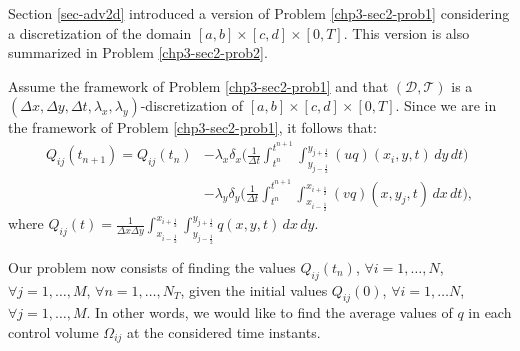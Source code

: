 Section \ref{sec-adv2d} introduced a version of Problem \ref{chp3-sec2-prob1}
considering a discretization of the domain $[a,b] \times [c,d] \times[0,T]$. 
This version is also summarized in Problem \ref{chp3-sec2-prob2}.	
\begin{prob}
	\label{chp3-sec2-prob2}
	Assume the framework of Problem \ref{chp3-sec2-prob1}
	and that $(\mathcal{D},\mathcal{T})$ is a $(\Delta x, \Delta y, \Delta t, \lambda_x,\lambda_y)$-discretization of $[a,b]\times [c,d]\times [0,T]$.
	Since we are in the framework of Problem \ref{chp3-sec2-prob1}, it follows that:
	\begin{align*}
		{Q}_{ij}(t_{n+1})  = {Q}_{ij}(t_{n})
		&- {\lambda_x}
		\delta _x \bigg( \frac{1}{\Delta t}
		\int_{t^n}^{t^{n+1}} \int_{y_{j-\frac{1}{2}}}^{y_{j+\frac{1}{2}}} 
		{(uq)}(x_{i}, y, t)
		\,dy \,dt \bigg) \\ \nonumber
		&- {\lambda_y}
		\delta _y \bigg( \frac{1}{\Delta t}
		\int_{t^n}^{t^{n+1}} \int_{x_{i-\frac{1}{2}}}^{x_{i+\frac{1}{2}}} 
		{(vq)}(x, y_{j}, t)
		\,dx \,dt \bigg),
	\end{align*}
	where ${Q}_{ij}(t) = \frac{1}{\Delta x \Delta y}
	\int_{x_{i-\frac{1}{2}}}^{x_{i+\frac{1}{2}}} 
	\int_{y_{j-\frac{1}{2}}}^{y_{j+\frac{1}{2}}} {q}(x,y,t) \,dx \,dy$.
	
	Our problem now consists of finding the values ${Q}_{ij}(t_{n})$, 
	$\forall i = 1, \ldots, N$, $\forall j = 1, \ldots, M$, $\forall n = 1, \ldots, N_T$,
    given the initial values ${Q}_{ij}(0)$, $\forall i = 1, \ldots N$, $\forall j = 1, \ldots, M$.
	In other words, we would like to find the average values of ${q}$
	in each control volume $\Omega_{ij}$ at the considered time instants.
\end{prob}

